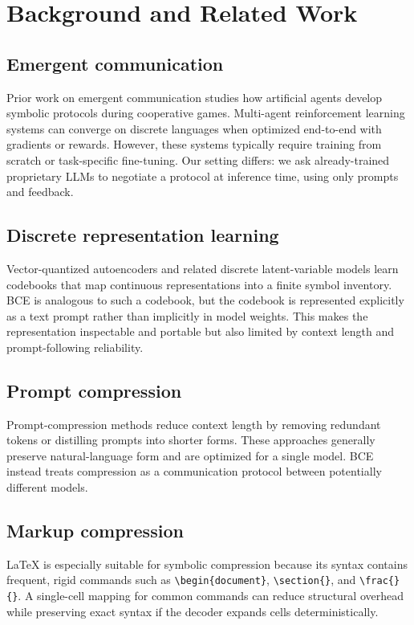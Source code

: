 \documentclass[11pt]{article}
\begin{document}
\section{Background and Related Work}
\subsection{Emergent communication}
Prior work on emergent communication studies how artificial agents develop symbolic protocols during cooperative games. Multi-agent reinforcement learning systems can converge on discrete languages when optimized end-to-end with gradients or rewards. However, these systems typically require training from scratch or task-specific fine-tuning. Our setting differs: we ask already-trained proprietary LLMs to negotiate a protocol at inference time, using only prompts and feedback.

\subsection{Discrete representation learning}
Vector-quantized autoencoders and related discrete latent-variable models learn codebooks that map continuous representations into a finite symbol inventory. BCE is analogous to such a codebook, but the codebook is represented explicitly as a text prompt rather than implicitly in model weights. This makes the representation inspectable and portable but also limited by context length and prompt-following reliability.

\subsection{Prompt compression}
Prompt-compression methods reduce context length by removing redundant tokens or distilling prompts into shorter forms. These approaches generally preserve natural-language form and are optimized for a single model. BCE instead treats compression as a communication protocol between potentially different models.

\subsection{Markup compression}
LaTeX is especially suitable for symbolic compression because its syntax contains frequent, rigid commands such as \verb|\begin{document}|, \verb|\section{}|, and \verb|\frac{}{}|. A single-cell mapping for common commands can reduce structural overhead while preserving exact syntax if the decoder expands cells deterministically.
\end{document}
